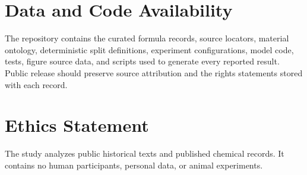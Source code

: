 \documentclass[11pt,a4paper]{article}
\begin{document}
\section*{Data and Code Availability}

The repository contains the curated formula records, source locators, material ontology, deterministic split definitions, experiment configurations, model code, tests, figure source data, and scripts used to generate every reported result. Public release should preserve source attribution and the rights statements stored with each record.

\section*{Ethics Statement}

The study analyzes public historical texts and published chemical records. It contains no human participants, personal data, or animal experiments.



\end{document}
